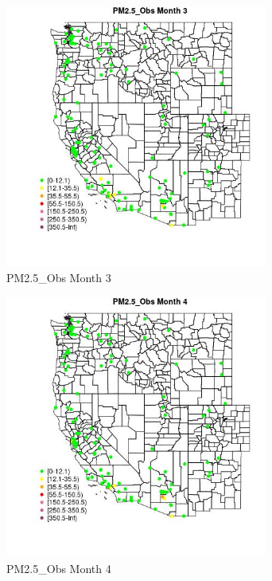 \begin{figure} 
\centering  
\includegraphics[width=0.77\textwidth]{Code_Outputs/Report_ML_input_PM25_Step4_part_e_de_duplicated_aves_MapObsMo3PM25_Obs.jpg} 
\caption{\label{fig:Report_ML_input_PM25_Step4_part_e_de_duplicated_avesMapObsMo3PM25_Obs}PM2.5_Obs Month 3} 
\end{figure} 
 

\begin{figure} 
\centering  
\includegraphics[width=0.77\textwidth]{Code_Outputs/Report_ML_input_PM25_Step4_part_e_de_duplicated_aves_MapObsMo4PM25_Obs.jpg} 
\caption{\label{fig:Report_ML_input_PM25_Step4_part_e_de_duplicated_avesMapObsMo4PM25_Obs}PM2.5_Obs Month 4} 
\end{figure} 
 

